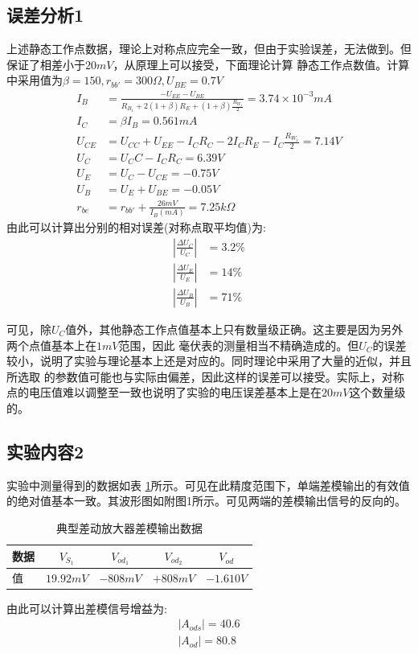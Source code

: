 \documentclass[a4paper,11pt,UTF8]{ctexart}
\begin{document}
\subsection{误差分析1}
  上述静态工作点数据，理论上对称点应完全一致，但由于实验误差，无法做到。但保证了相差小于$20mV$，从原理上可以接受，下面理论计算
  静态工作点数值。计算中采用值为$\beta=150,r_{bb'}=300\Omega,U_{BE}=0.7V$
  \begin{equation}
    \begin{aligned}
      I_{B}&=\frac{-U_{EE}-U_{BE}}{R_{B_1}+2(1+\beta)R_E+(1+\beta)\frac{R_{W_1}}{2}}=3.74\times10^{-3}mA\\
      I_{C}&=\beta I_{B}=0.561mA\\
      U_{CE}&=U_{CC}+U_{EE}-I_CR_C-2I_CR_E-I_C\frac{R_{W_1}}{2}=7.14V\\
      U_C&=U_CC-I_CR_C=6.39V\\
      U_E&=U_C-U_{CE}=-0.75V\\
      U_B&=U_E+U_{BE}=-0.05V\\
      r_{be}&=r_{bb'}+\frac{26mV}{I_B(mA)}=7.25k\Omega
    \end{aligned}
  \end{equation}
  由此可以计算出分别的相对误差(对称点取平均值)为:
  \begin{equation}
    \begin{aligned}
      \left |\frac{\Delta U_C}{U_C}\right |&=3.2\%\\
      \left |\frac{\Delta U_E}{U_E}\right |&=14\%\\
      \left |\frac{\Delta U_B}{U_B}\right |&=71\%
    \end{aligned}
  \end{equation}

  可见，除$U_C$值外，其他静态工作点值基本上只有数量级正确。这主要是因为另外两个点值基本上在$1mV$范围，因此
毫伏表的测量相当不精确造成的。但$U_C$的误差较小，说明了实验与理论基本上还是对应的。同时理论中采用了大量的近似，并且所选取
的参数值可能也与实际由偏差，因此这样的误差可以接受。实际上，对称点的电压值难以调整至一致也说明了实验的电压误差基本上是在$20mV$这个数量级的。
\subsection{实验内容2}
实验中测量得到的数据如表 \ref{tab:ndTab}所示。可见在此精度范围下，单端差模输出的有效值的绝对值基本一致。其波形图如附图1所示。可见两端的差模输出信号的反向的。
\begin{table}[!h!tbp]
  \caption{典型差动放大器差模输出数据}\label{tab:ndTab}
    \centering
    \begin{tabular}{|l|c|c|c|c|}
    \hline
    数据 &$V_{S_1}$&$V_{od_1}$&$V_{od_2}$&$V_{od}$         \\ \hline
    值   &$19.92mV$&$-808mV$&$+808mV$&$-1.610V$     \\ \hline
  \end{tabular}
  \end{table}
由此可以计算出差模信号增益为:
\begin{equation}
  \begin{aligned}
    \left |A_{ods}\right |=40.6\\
    \left |A_{od}\right |=80.8
  \end{aligned}
\end{equation}
\end{document}
